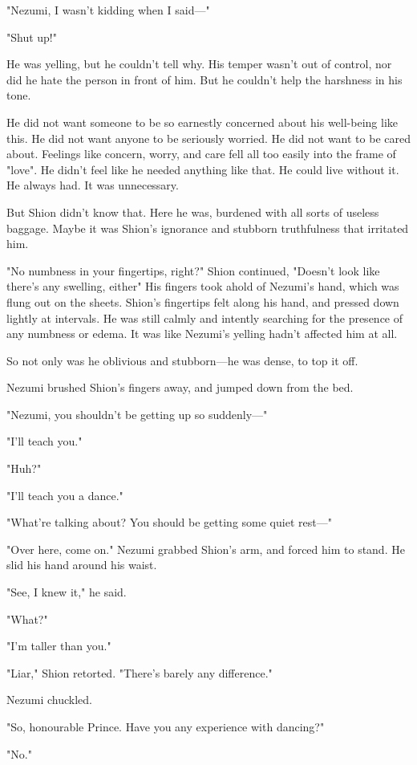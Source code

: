 "Nezumi, I wasn't kidding when I said---"

"Shut up!"

He was yelling, but he couldn't tell why. His temper wasn't out of
control, nor did he hate the person in front of him. But he couldn't
help the harshness in his tone.

He did not want someone to be so earnestly concerned about his
well-being like this. He did not want anyone to be seriously worried. He
did not want to be cared about. Feelings like concern, worry, and care
fell all too easily into the frame of "love". He didn't feel like he
needed anything like that. He could live without it. He always had. It
was unnecessary.

But Shion didn't know that. Here he was, burdened with all sorts of
useless baggage. Maybe it was Shion's ignorance and stubborn
truthfulness that irritated him.

"No numbness in your fingertips, right?" Shion continued, "Doesn't look
like there's any swelling, either\el " His fingers took ahold of Nezumi's
hand, which was flung out on the sheets. Shion's fingertips felt along
his hand, and pressed down lightly at intervals. He was still calmly and
intently searching for the presence of any numbness or edema. It was
like Nezumi's yelling hadn't affected him at all.

So not only was he oblivious and stubborn---he was dense, to top it off.

Nezumi brushed Shion's fingers away, and jumped down from the bed.

"Nezumi, you shouldn't be getting up so suddenly---"

"I'll teach you."

"Huh?"

"I'll teach you a dance."

"What're talking about? You should be getting some quiet rest---"

"Over here, come on." Nezumi grabbed Shion's arm, and forced him to
stand. He slid his hand around his waist.

"See, I knew it," he said.

"What?"

"I'm taller than you."

"Liar," Shion retorted. "There's barely any difference."

Nezumi chuckled.

"So, honourable Prince. Have you any experience with dancing?"

"No."

